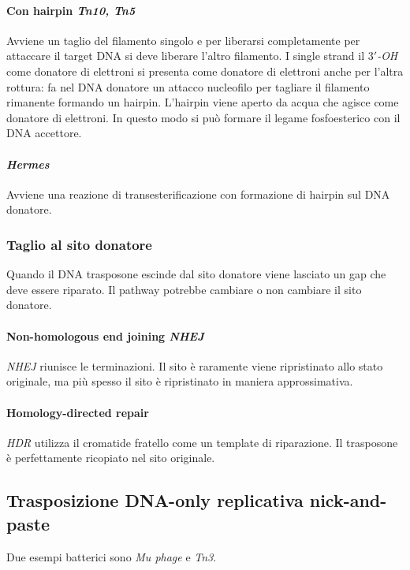 			\paragraph{Con hairpin \emph{Tn10, Tn5}}
			Avviene un taglio del filamento singolo e per liberarsi completamente per attaccare il target DNA si deve liberare l'altro filamento.
			I single strand il \emph{$3'$-OH} come donatore di elettroni si presenta come donatore di elettroni anche per l'altra rottura: fa nel DNA donatore un attacco nucleofilo per tagliare il filamento rimanente formando un hairpin.
			L'hairpin viene aperto da acqua che agisce come donatore di elettroni.
			In questo modo si pu\`o formare il legame fosfoesterico con il DNA accettore.

			\paragraph{\emph{Hermes}}
			Avviene una reazione di transesterificazione con formazione di hairpin sul DNA donatore.

		\subsubsection{Taglio al sito donatore}
		Quando il DNA trasposone escinde dal sito donatore viene lasciato un gap che deve essere riparato.
		Il pathway potrebbe cambiare o non cambiare il sito donatore.
	
			\paragraph{Non-homologous end joining \emph{NHEJ}}
			\emph{NHEJ} riunisce le terminazioni.
			Il sito \`e raramente viene ripristinato allo stato originale, ma pi\`u spesso il sito \`e ripristinato in maniera approssimativa.

			\paragraph{Homology-directed repair}
			\emph{HDR} utilizza il cromatide fratello come un template di riparazione.
			Il trasposone \`e perfettamente ricopiato nel sito originale.

	\subsection{Trasposizione DNA-only replicativa nick-and-paste}
	Due esempi batterici sono \emph{Mu phage} e \emph{Tn3}.

